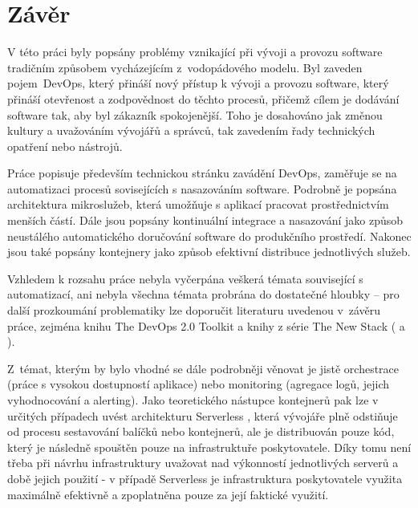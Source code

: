 \documentclass[FM,DP]{tulthesis}
\begin{document}
\chapter{Závěr}

V této práci byly popsány problémy vznikající při vývoji a provozu software tradičním způsobem vycházejícím
z~vodopádového modelu. Byl zaveden pojem~DevOps, který přináší nový přístup k vývoji a provozu software, který
přináší otevřenost a zodpovědnost do těchto procesů, přičemž cílem je dodávání software tak, aby byl zákazník
spokojenější. Toho je dosahováno jak změnou kultury a uvažováním vývojářů a správců, tak zavedením řady technických
opatření nebo nástrojů.

Práce popisuje především technickou stránku zavádění DevOps, zaměřuje se na automatizaci procesů sovisejících
s nasazováním software. Podrobně je popsána architektura mikroslužeb, která umožňuje s aplikací pracovat 
prostřednictvím menších částí. Dále jsou popsány kontinuální integrace a nasazování jako způsob neustálého
automatického doručování software do produkčního prostředí. Nakonec jsou také popsány kontejnery jako způsob
efektivní distribuce jednotlivých služeb.

Vzhledem k rozsahu práce nebyla vyčerpána veškerá témata související s automatizací, ani nebyla všechna témata
probrána do dostatečné hloubky -- pro další prozkoumání problematiky lze doporučit literaturu uvedenou v~závěru
práce, zejména knihu The DevOps 2.0 Toolkit \cite{devops} a knihy z série The New Stack (\cite{microservices} a 
\cite{orchestration}). 

Z~témat, kterým by bylo vhodné se dále podrobněji věnovat je jistě orchestrace
(práce s vysokou dostupností aplikace) nebo monitoring (agregace logů, jejich vyhodnocování a alerting).
Jako teoretického nástupce kontejnerů pak lze v určitých případech uvést architekturu Serverless \cite{serverless},
která vývojáře plně odstiňuje od procesu sestavování balíčků nebo kontejnerů, ale je distribuován pouze kód, 
který je následně spouštěn pouze na infrastruktuře poskytovatele. Díky tomu není třeba při návrhu infrastruktury
uvažovat nad výkonností jednotlivých serverů a době jejich použití - v případě Serverless je infrastruktura
poskytovatele využita maximálně efektivně a zpoplatněna pouze za její faktické využití.
\end{document}
